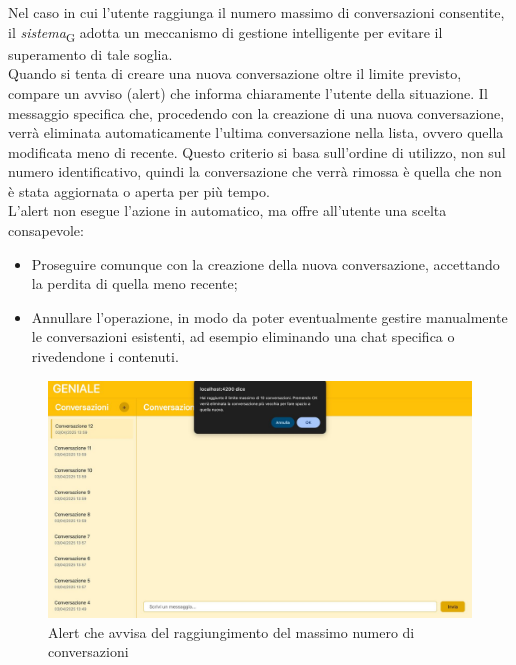 Nel caso in cui l’utente raggiunga il numero massimo di conversazioni consentite, il \textit{sistema}\textsubscript{G} adotta un meccanismo di gestione intelligente per evitare il superamento di tale soglia. \\
Quando si tenta di creare una nuova conversazione oltre il limite previsto, compare un avviso (alert) che informa chiaramente l’utente della situazione. Il messaggio specifica che, procedendo con la creazione di una nuova conversazione, verrà eliminata automaticamente l’ultima conversazione nella lista, ovvero quella modificata meno di recente. Questo criterio si basa sull’ordine di utilizzo, non sul numero identificativo, quindi la conversazione che verrà rimossa è quella che non è stata aggiornata o aperta per più tempo. \\
L’alert non esegue l’azione in automatico, ma offre all’utente una scelta consapevole:
\begin{itemize}
    \item Proseguire comunque con la creazione della nuova conversazione, accettando la perdita di quella meno recente;
    \item Annullare l’operazione, in modo da poter eventualmente gestire manualmente le conversazioni esistenti, ad esempio eliminando una chat specifica o rivedendone i contenuti.
\end{itemize}
\begin{figure}[H]
\centering
\includegraphics[width=1\textwidth]{contents/img/max_conv.jpg}
\caption{Alert che avvisa del raggiungimento del massimo numero di conversazioni}
\end{figure}

